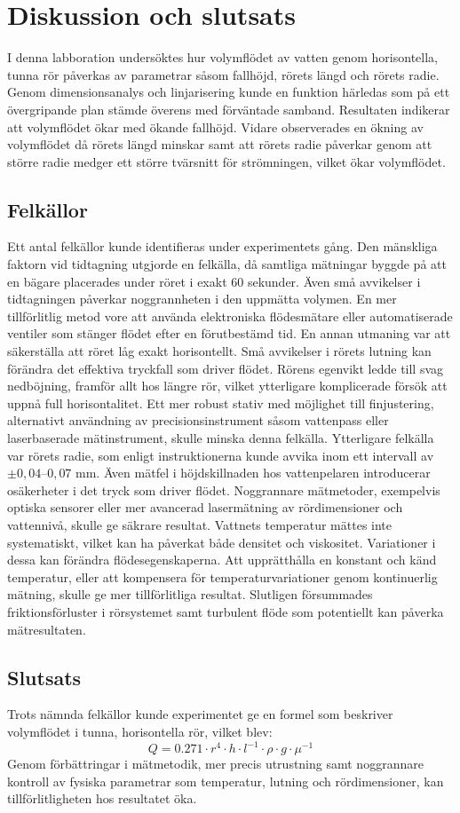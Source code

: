 \documentclass[a4paper,12pt]{article}
\begin{document}
\section{Diskussion och slutsats}
%
I denna labboration undersöktes hur volymflödet av vatten genom horisontella, tunna rör påverkas av parametrar såsom fallhöjd, rörets längd och rörets radie. Genom dimensionsanalys och linjarisering kunde en funktion härledas som på ett övergripande plan stämde överens med förväntade samband. Resultaten indikerar att volymflödet ökar med ökande fallhöjd. Vidare observerades en ökning av volymflödet då rörets längd minskar samt att rörets radie påverkar genom att större radie medger ett större tvärsnitt för strömningen, vilket ökar volymflödet.
%
\subsection{Felkällor}
Ett antal felkällor kunde identifieras under experimentets gång. Den mänskliga faktorn vid tidtagning utgjorde en felkälla, då samtliga mätningar byggde på att en bägare placerades under röret i exakt 60 sekunder. Även små avvikelser i tidtagningen påverkar noggrannheten i den uppmätta volymen. En mer tillförlitlig metod vore att använda elektroniska flödesmätare eller automatiserade ventiler som stänger flödet efter en förutbestämd tid.
%
En annan utmaning var att säkerställa att röret låg exakt horisontellt. Små avvikelser i rörets lutning kan förändra det effektiva tryckfall som driver flödet. Rörens egenvikt ledde till svag nedböjning, framför allt hos längre rör, vilket ytterligare komplicerade försök att uppnå full horisontalitet. Ett mer robust stativ med möjlighet till finjustering, alternativt användning av precisionsinstrument såsom vattenpass eller laserbaserade mätinstrument, skulle minska denna felkälla.
%
Ytterligare felkälla var rörets radie, som enligt instruktionerna kunde avvika inom ett intervall av $\pm 0,04$--$0,07$ mm. 
Även mätfel i höjdskillnaden hos vattenpelaren introducerar osäkerheter i det tryck som driver flödet. Noggrannare mätmetoder, exempelvis optiska sensorer eller mer avancerad lasermätning av rördimensioner och vattennivå, skulle ge säkrare resultat.
%
Vattnets temperatur mättes inte systematiskt, vilket kan ha påverkat både densitet och viskositet. Variationer i dessa kan förändra flödesegenskaperna. Att upprätthålla en konstant och känd temperatur, eller att kompensera för temperaturvariationer genom kontinuerlig mätning, skulle ge mer tillförlitliga resultat.
%
Slutligen försummades friktionsförluster i rörsystemet samt turbulent flöde som potentiellt kan påverka mätresultaten.
\subsection{Slutsats}
Trots nämnda felkällor kunde experimentet ge en formel som beskriver volymflödet i tunna, horisontella rör, vilket blev:
\[
Q = 0.271 \cdot r^4 \cdot h \cdot l^{-1} \cdot \rho \cdot g \cdot \mu^{-1}
\]
Genom förbättringar i mätmetodik, mer precis utrustning samt noggrannare kontroll av fysiska parametrar som temperatur, lutning och rördimensioner, kan tillförlitligheten hos resultatet öka. 
%
\end{document}
